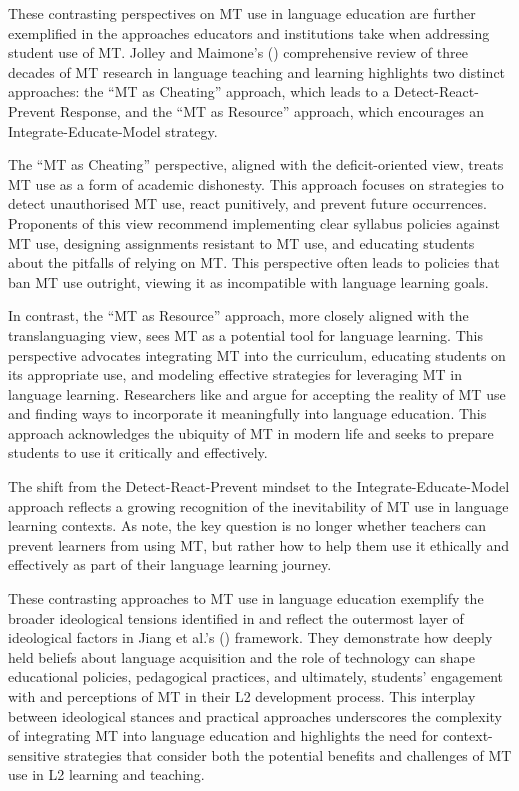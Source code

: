 \documentclass[output=paper]{langscibook}
\begin{document}
These contrasting perspectives on MT use in language education are further exemplified in the approaches educators and institutions take when addressing student use of MT. Jolley and Maimone’s (\citeyear{jolley22}) comprehensive review of three decades of MT research in language teaching and learning highlights two distinct approaches: the “MT as Cheating” approach, which leads to a Detect-React-Prevent Response, and the “MT as Resource” approach, which encourages an Integrate-Educate-Model strategy.

The “MT as Cheating” perspective, aligned with the deficit-oriented view, treats MT use as a form of academic dishonesty. This approach focuses on strategies to detect unauthorised MT use, react punitively, and prevent future occurrences. Proponents of this view recommend implementing clear syllabus policies against MT use, designing assignments resistant to MT use, and educating students about the pitfalls of relying on MT. This perspective often leads to policies that ban MT use outright, viewing it as incompatible with language learning goals.

In contrast, the “MT as Resource” approach, more closely aligned with the translanguaging view, sees MT as a potential tool for language learning. This perspective advocates integrating MT into the curriculum, educating students on its appropriate use, and modeling effective strategies for leveraging MT in language learning. Researchers like \citet{stapleton2019} and \citet{nino20} argue for accepting the reality of MT use and finding ways to incorporate it meaningfully into language education. This approach acknowledges the ubiquity of MT in modern life and seeks to prepare students to use it critically and effectively.

The shift from the Detect-React-Prevent mindset to the Integrate-Educate-Model approach reflects a growing recognition of the inevitability of MT use in language learning contexts. As \citet{ducarschocket18} note, the key question is no longer whether teachers can prevent learners from using MT, but rather how to help them use it ethically and effectively as part of their language learning journey.

These contrasting approaches to MT use in language education exemplify the broader ideological tensions identified in \citet{grieveetal24} and reflect the outermost layer of ideological factors in Jiang et al.’s (\citeyear{jiangetal24}) framework. They demonstrate how deeply held beliefs about language acquisition and the role of technology can shape educational policies, pedagogical practices, and ultimately, students’ engagement with and perceptions of MT in their L2 development process. This interplay between ideological stances and practical approaches underscores the complexity of integrating MT into language education and highlights the need for context-sensitive strategies that consider both the potential benefits and challenges of MT use in L2 learning and teaching.
\end{document}
